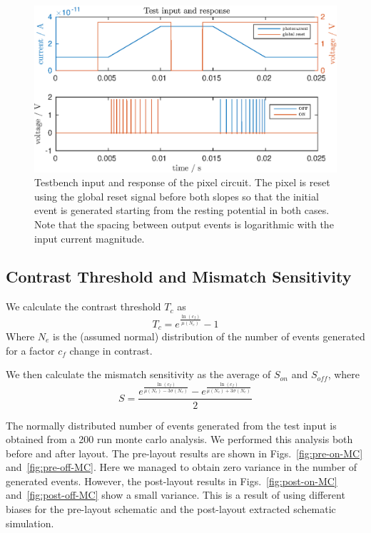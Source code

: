 \begin{figure}
    \center
    \includegraphics{pixel-response.eps}
    \caption{Testbench input and response of the pixel circuit. The pixel is reset using the global reset signal
    before both slopes so that the initial event is generated starting from the resting potential in both cases. 
    Note that the spacing between output events is logarithmic with the input current magnitude.}
    \label{fig:pixel-response}
\end{figure}
\subsection{Contrast Threshold and Mismatch Sensitivity}
We calculate the contrast threshold \(T_c\) as
\begin{equation*}
    T_c = e^{\frac{\ln(c_f)}{\mu(N_e)}} - 1
\end{equation*}
Where \(N_e\) is the (assumed normal) distribution of the  number of events generated for a factor \(c_f\) change in contrast.

We then calculate the mismatch sensitivity as the average of \(S_{on}\) and \(S_{off}\), where
\begin{equation*}
    S = \frac{e^{\frac{\ln(c_f)}{\mu(N_e)-3\sigma(N_e)}}-e^{\frac{\ln(c_f)}{\mu(N_e)+3\sigma(N_e)}}}{2}
\end{equation*}

The normally distributed number of events generated from the test input is obtained from a 200 run monte carlo 
analysis. We performed this analysis both before and after layout. The pre-layout results are shown in 
Figs.~\ref{fig:pre-on-MC} and~\ref{fig:pre-off-MC}. Here we managed to obtain zero variance in the number of generated
events. However, the post-layout results in Figs.~\ref{fig:post-on-MC} and~\ref{fig:post-off-MC} show a small variance.
This is a result of using different biases for the pre-layout schematic and the post-layout extracted schematic simulation.


